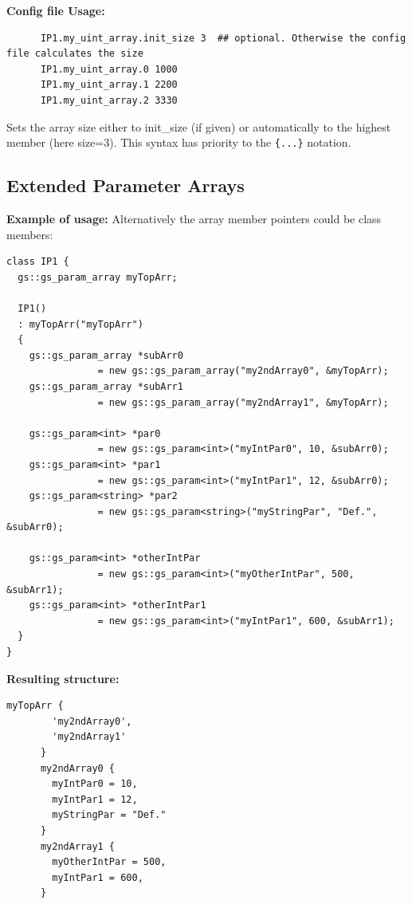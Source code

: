 \noindent
\begin{minipage}{\textwidth}
{\bf Config file Usage:}
\begin{lstlisting}
      IP1.my_uint_array.init_size 3  ## optional. Otherwise the config file calculates the size
      IP1.my_uint_array.0 1000
      IP1.my_uint_array.1 2200
      IP1.my_uint_array.2 3330
\end{lstlisting}
\end{minipage}

Sets the array size either to \textsf{init\_size} (if given) or automatically to the highest member (here \textsf{size=3}). This syntax has priority to the \lstinline|{...}| notation.

\subsection{Extended Parameter Arrays}
\label{ExtParArr}

\noindent
\begin{minipage}{\textwidth}
{\bf Example of usage:} Alternatively the array member pointers could be class members:
\begin{lstlisting}
class IP1 {
  gs::gs_param_array myTopArr;
       
  IP1()
  : myTopArr("myTopArr")
  {
    gs::gs_param_array *subArr0
                = new gs::gs_param_array("my2ndArray0", &myTopArr);
    gs::gs_param_array *subArr1 
                = new gs::gs_param_array("my2ndArray1", &myTopArr);
       
    gs::gs_param<int> *par0
                = new gs::gs_param<int>("myIntPar0", 10, &subArr0);
    gs::gs_param<int> *par1 
                = new gs::gs_param<int>("myIntPar1", 12, &subArr0);
    gs::gs_param<string> *par2 
                = new gs::gs_param<string>("myStringPar", "Def.", &subArr0);
       
    gs::gs_param<int> *otherIntPar  
                = new gs::gs_param<int>("myOtherIntPar", 500, &subArr1);
    gs::gs_param<int> *otherIntPar1 
                = new gs::gs_param<int>("myIntPar1", 600, &subArr1);
  }
}
\end{lstlisting}
\end{minipage}

\noindent
\begin{minipage}{\textwidth}
{\bf Resulting structure:}
\begin{lstlisting}[language=TeX]
      myTopArr {
        'my2ndArray0',
        'my2ndArray1'
      }
      my2ndArray0 {
        myIntPar0 = 10,
        myIntPar1 = 12,
        myStringPar = "Def."
      }
      my2ndArray1 {
        myOtherIntPar = 500,
        myIntPar1 = 600,
      }
\end{lstlisting}
\end{minipage}

